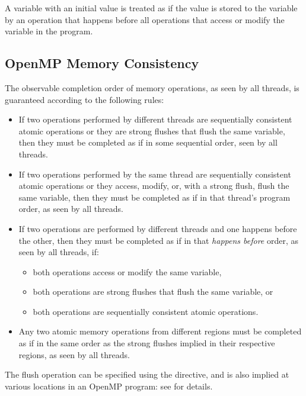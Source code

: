 A variable with an initial value is treated as if the value is stored to the
variable by an operation that happens before all operations that access or
modify the variable in the program.

\subsection{OpenMP Memory Consistency}
\label{subsec:OpenMP Memory Consistency}

The observable completion order of memory operations, as seen by all threads, is
guaranteed according to the following rules:

\begin{itemize}
\item If two operations performed by different threads are sequentially
    consistent atomic operations or they are strong flushes that flush the
    same variable, then they must be completed as if in some sequential order,
    seen by all threads.

\item If two operations performed by the same thread are sequentially
    consistent atomic operations or they access, modify, or, with a strong
    flush, flush the same variable, then they must be completed as if in that
    thread's program order, as seen by all threads.

\item If two operations are performed by different threads and one happens
    before the other, then they must be completed as if in that \emph{happens before}
    order, as seen by all threads, if:
    \begin{itemize}
        \item both operations access or modify the same variable,
        \item both operations are strong flushes that flush the same variable, or
        \item both operations are sequentially consistent atomic operations.
    \end{itemize}

\item Any two atomic memory operations from different  regions
    must be completed as if in the same order as the strong flushes
    implied in their respective regions, as seen by all threads.
\end{itemize}

The flush operation can be specified using the  directive, and is also implied at
various locations in an OpenMP program: see  for details.

